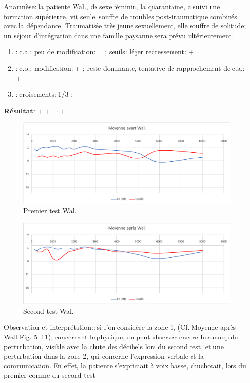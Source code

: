 Anamnèse: la patiente Wal., de sexe féminin, la quarantaine, a suivi une formation supérieure, vit seule,  
souffre de troubles post-traumatique combinés avec la dépendance. Traumatisée très jeune 
sexuellement, elle souffre de solitude;  un séjour d'intégration dans une famille paysanne sera prévu 
ultérieurement.
	\begin{enumerate}

 		\item : c.a.: peu de modification: = ;  seuils: léger redressement: +

 		\item : c.o.:  modification:  + ; reste dominante, tentative de rapprochement de c.a.: +
 		\item : croisements: 1/3 :  -

                \end{enumerate}

                \textbf{ Résultat:  $ + +  -        : +$ }
\begin{figure}[th]
	\centering
	\includegraphics[width=0.7\linewidth]{images/graphiques/wal_pre.png}
	\caption[Patient Wal. :1° test]{Premier test Wal.}
	
\end{figure}
               \begin{figure}%
\centering
\includegraphics[width=0.7\linewidth]{images/graphiques/wal_post.png}
\caption[Patient Wal. : 2° test]{Second test Wal.}

\label{groupecontroleimage1}
\end{figure}


Observation et interprétation:: si l'on considère la zone 1, (Cf. Moyenne après Wall Fig. 5. 11),  concernant 
le 
physique, on 
peut observer 
encore beaucoup de 
perturbation, visible avec la chute des décibels lors du second test,  et une perturbation dans la zone 2, 
qui concerne l'expression verbale et la communication. En effet, la patiente s'exprimait  à voix basse, 
chuchotait, lors du premier comme du second test.


